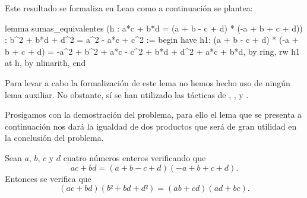 Este resultado se formaliza en Lean como a continuación se plantea:
\begin{leancode}
lemma sumas_equivalentes
  (h : a*c + b*d = (a + b - c + d) * (-a + b + c + d))
  : b^2 + b*d + d^2 = a^2 - a*c + c^2 :=
begin
  have h1: (a + b - c + d) * (-a + b + c + d) =
           -a^2  + b^2  + a*c - c^2 + b*d + d^2 + a*c + b*d,
    by ring,
  rw h1 at h,
  by nlinarith,
end
\end{leancode}

Para levar a cabo la formalización de este lema no hemos hecho uso de
ningún lema auxiliar. No obstante, sí se han utilizado las tácticas de
,
,
 y
.

Prosigamos con la demostración del problema, para ello el lema que se
presenta a continuación nos dará la igualdad de dos productos que será
de gran utilidad en la conclusión del problema.

\begin{lema}\label{q601lemaprod}
  Sean \(a\), \(b\), \(c\) y \(d\) cuatro números enteros verificando
  que
    \begin{equation}\label{q601hipprod}\tag{h}
      ac+bd = (a+b-c+d)(-a+b+c+d).
    \end{equation}
    Entonces se verifica que
    \begin{equation}\label{q601objprod}
      (ac+bd)(b²+bd+d²) = (ab+cd)(ad+bc).
    \end{equation}
\end{lema}

